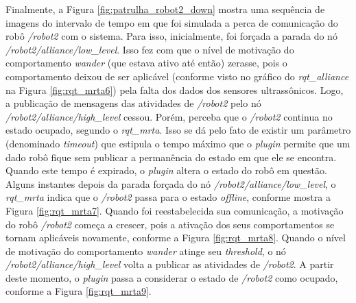             Finalmente, a Figura \ref{fig:patrulha_robot2_down} mostra uma sequência de imagens do intervalo de tempo em que foi simulada a perca de comunicação do robô \textit{/robot2} com o sistema. Para isso, inicialmente, foi forçada a parada do nó \textit{/robot2/alliance/low\_level}. Isso fez com que o nível de motivação do comportamento \textit{wander} (que estava ativo até então) zerasse, pois o comportamento deixou de ser aplicável (conforme visto no gráfico do \textit{rqt\_alliance} na Figura \ref{fig:rqt_mrta6}) pela falta dos dados dos sensores ultrassônicos. Logo, a publicação de mensagens das atividades de \textit{/robot2} pelo nó \textit{/robot2/alliance/high\_level} cessou. Porém, perceba que o \textit{/robot2} continua no estado ocupado, segundo o \textit{rqt\_mrta}. Isso se dá pelo fato de existir um parâmetro (denominado \textit{timeout}) que estipula o tempo máximo que o \textit{plugin} permite que um dado robô fique sem publicar a permanência do estado em que ele se encontra. Quando este tempo é expirado, o \textit{plugin} altera o estado do robô em questão. Alguns instantes depois da parada forçada do nó \textit{/robot2/alliance/low\_level}, o \textit{rqt\_mrta} indica que o \textit{/robot2} passa para o estado \textit{offline}, conforme mostra a Figura \ref{fig:rqt_mrta7}. Quando foi reestabelecida sua comunicação, a motivação do robô \textit{/robot2} começa a crescer, pois a ativação dos seus comportamentos se tornam aplicáveis novamente, conforme a Figura \ref{fig:rqt_mrta8}. Quando o nível de motivação do comportamento \textit{wander} atinge seu \textit{threshold}, o nó \textit{/robot2/alliance/high\_level} volta a publicar as atividades de \textit{/robot2}. A partir deste momento, o \textit{plugin} passa a considerar o estado de \textit{/robot2} como ocupado, conforme a Figura \ref{fig:rqt_mrta9}.
            
